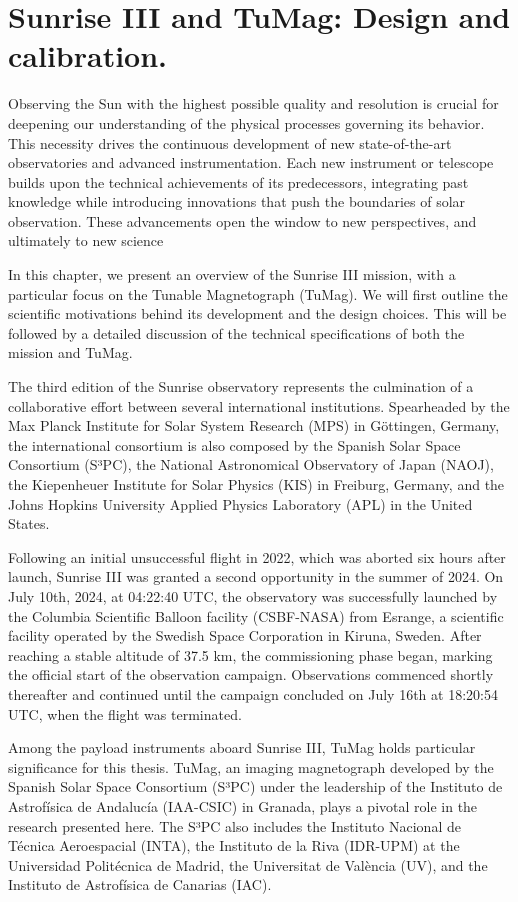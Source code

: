 \chapter{Sunrise III and TuMag: Design and calibration.}

Observing the Sun with the highest possible quality and resolution is crucial for deepening our understanding of the physical processes governing its behavior. This necessity drives the continuous development of new state-of-the-art observatories and advanced instrumentation. Each new instrument or telescope builds upon the technical achievements of its predecessors, integrating past knowledge while introducing innovations that push the boundaries of solar observation. These advancements open the window to new perspectives, and ultimately to new science

In this chapter, we present an overview of the Sunrise III mission, with a particular focus on the Tunable Magnetograph (TuMag). We will first outline the scientific motivations behind its development and the design choices. This will be followed by a detailed discussion of the technical specifications of both the mission and TuMag.

The third edition of the Sunrise observatory represents the culmination of a collaborative effort between several international institutions. Spearheaded by the Max Planck Institute for Solar System Research (MPS) in Göttingen, Germany, the international consortium is also composed by the Spanish Solar Space Consortium (S³PC), the National Astronomical Observatory of Japan (NAOJ), the Kiepenheuer Institute for Solar Physics (KIS) in Freiburg, Germany, and the Johns Hopkins University Applied Physics Laboratory (APL) in the United States. 

Following an initial unsuccessful flight in 2022, which was aborted six hours after launch, Sunrise III was granted a second opportunity in the summer of 2024. On July 10th, 2024, at 04:22:40 UTC, the observatory was successfully launched by the Columbia Scientific Balloon facility (CSBF-NASA) from Esrange, a scientific facility operated by the Swedish Space Corporation in Kiruna, Sweden. After reaching a stable altitude of 37.5 km, the commissioning phase began, marking the official start of the observation campaign. Observations commenced shortly thereafter and continued until the campaign concluded on July 16th at 18:20:54 UTC, when the flight was terminated.

Among the payload instruments aboard Sunrise III, TuMag holds particular significance for this thesis. TuMag, an imaging magnetograph developed by the Spanish Solar Space Consortium (S³PC) under the leadership of the Instituto de Astrofísica de Andalucía (IAA-CSIC) in Granada, plays a pivotal role in the research presented here. The S³PC also includes the Instituto Nacional de Técnica Aeroespacial (INTA), the Instituto de la Riva (IDR-UPM) at the Universidad Politécnica de Madrid, the Universitat de València (UV), and the Instituto de Astrofísica de Canarias (IAC).

